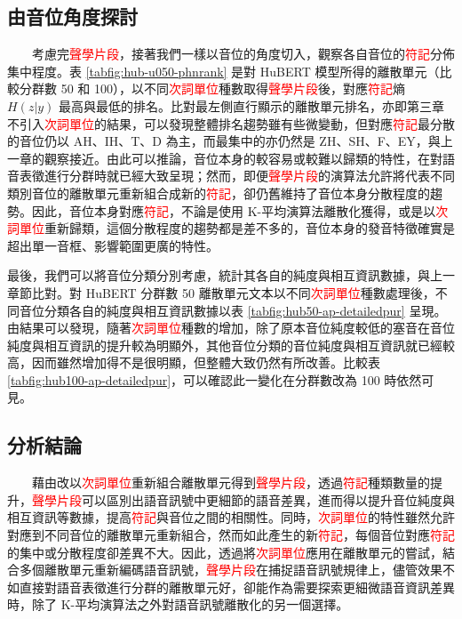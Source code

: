 \subsection{由音位角度探討}

　　考慮完\textcolor{red}{聲學片段}，接著我們一樣以音位的角度切入，觀察各自音位的\textcolor{red}{符記}分佈集中程度。表 \ref{tabfig:hub-u050-phnrank} 是對 HuBERT 模型所得的離散單元（比較分群數 50 和 100），以不同\textcolor{red}{次詞單位}種數取得\textcolor{red}{聲學片段}後，對應\textcolor{red}{符記}熵 $H(z|y)$ 最高與最低的排名。比對最左側直行顯示的離散單元排名，亦即第三章不引入\textcolor{red}{次詞單位}的結果，可以發現整體排名趨勢雖有些微變動，但對應\textcolor{red}{符記}最分散的音位仍以 AH、IH、T、D 為主，而最集中的亦仍然是 ZH、SH、F、EY，與上一章的觀察接近。由此可以推論，音位本身的較容易或較難以歸類的特性，在對語音表徵進行分群時就已經大致呈現；然而，即便\textcolor{red}{聲學片段}的演算法允許將代表不同類別音位的離散單元重新組合成新的\textcolor{red}{符記}，卻仍舊維持了音位本身分散程度的趨勢。因此，音位本身對應\textcolor{red}{符記}，不論是使用 K-平均演算法離散化獲得，或是以\textcolor{red}{次詞單位}重新歸類，這個分散程度的趨勢都是差不多的，音位本身的發音特徵確實是超出單一音框、影響範圍更廣的特性。 
  
        最後，我們可以將音位分類分別考慮，統計其各自的純度與相互資訊數據，與上一章節比對。對 HuBERT 分群數 50 離散單元文本以不同\textcolor{red}{次詞單位}種數處理後，不同音位分類各自的純度與相互資訊數據以表 \ref{tabfig:hub50-ap-detailedpur} 呈現。由結果可以發現，隨著\textcolor{red}{次詞單位}種數的增加，除了原本音位純度較低的塞音在音位純度與相互資訊的提升較為明顯外，其他音位分類的音位純度與相互資訊就已經較高，因而雖然增加得不是很明顯，但整體大致仍然有所改善。比較表 \ref{tabfig:hub100-ap-detailedpur}，可以確認此一變化在分群數改為 100 時依然可見。

\subsection{分析結論}

　　藉由改以\textcolor{red}{次詞單位}重新組合離散單元得到\textcolor{red}{聲學片段}，透過\textcolor{red}{符記}種類數量的提升，\textcolor{red}{聲學片段}可以區別出語音訊號中更細節的語音差異，進而得以提升音位純度與相互資訊等數據，提高\textcolor{red}{符記}與音位之間的相關性。同時，\textcolor{red}{次詞單位}的特性雖然允許對應到不同音位的離散單元重新組合，然而如此產生的新\textcolor{red}{符記}，每個音位對應\textcolor{red}{符記}的集中或分散程度卻差異不大。因此，透過將\textcolor{red}{次詞單位}應用在離散單元的嘗試，結合多個離散單元重新編碼語音訊號，\textcolor{red}{聲學片段}在捕捉語音訊號規律上，儘管效果不如直接對語音表徵進行分群的離散單元好，卻能作為需要探索更細微語音資訊差異時，除了 K-平均演算法之外對語音訊號離散化的另一個選擇。

